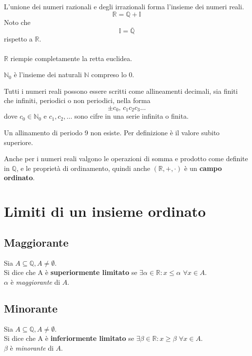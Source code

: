 \documentclass[a4paper,12pt, oneside]{book}
\begin{document}
L'unione dei numeri razionali e degli irrazionali forma l'insieme dei numeri reali.
\begin{equation}
	\mathbb{R} = \mathbb{Q} + \mathbb{I}
\end{equation}
Noto che
\begin{equation}
	\mathbb{I} = \overline{\mathbb{Q}}
\end{equation}
rispetto a $\mathbb{R}$.\\\\
$\mathbb{R}$ riempie completamente la retta euclidea.
\begin{shaded}
	\begin{nota}
		$\mathbb{N}_0$ è l'insieme dei naturali $\mathbb{N}$ compreso lo 0.
	\end{nota}
\end{shaded}
Tutti i numeri reali possono essere scritti come allineamenti decimali, sia finiti che infiniti, periodici o non periodici, nella forma
$$\pm c_0,\,c_1c_2c_3\dots$$
dove $c_0\in\mathbb{N}_0$ e $c_1,c_2,\dots$ sono cifre in una serie infinita o finita.
\begin{shaded}
	\begin{nota}
		Un allinamento di periodo 9 non esiste. Per definizione è il valore subito superiore.
	\end{nota}
\end{shaded}
Anche per i numeri reali valgono le operazioni di somma e prodotto come definite in $\mathbb{Q}$, e le proprietà di ordinamento, quindi anche $(\mathbb{R},+,\cdot)$ è un \textbf{campo ordinato}.
\section{Limiti di un insieme ordinato}
\subsection{Maggiorante}
\begin{definizione}
	Sia $A \subseteq \mathbb{Q}, A \neq \emptyset$.\\
	Si dice che A è \textbf{superiormente limitato} se $\exists\alpha\in\mathbb{R}\colon x\leq\alpha$ $\forall x\in A$.\\
	$\alpha$ è \emph{maggiorante} di $A$.
\end{definizione}
\subsection{Minorante}
\begin{definizione}
	Sia $A \subseteq \mathbb{Q}, A \neq \emptyset$.\\
	Si dice che A è \textbf{inferiormente limitato} se $\exists\beta\in\mathbb{R}\colon x\geq\beta$ $\forall x\in A$.\\
	$\beta$ è \emph{minorante} di $A$.
\end{definizione}
\end{document}
